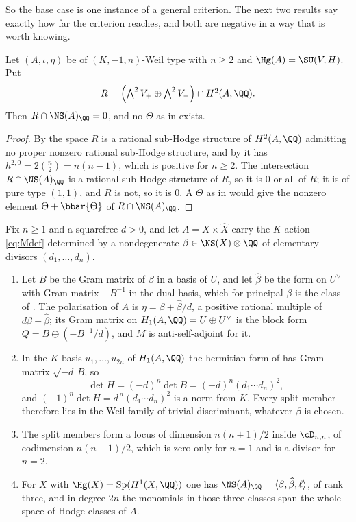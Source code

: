 So the base case is one instance of a general criterion. The next two results
say exactly how far the criterion reaches, and both are negative in a way that
is worth knowing.

\begin{proposition}\label{prop:divfails}
Let $(A,\iota,\eta)$ be of $(K,-1,n)$-Weil type with $n\ge2$ and
$\Hg(A)=\SU(V,H)$. Put
\[
  R=\Bigl(\textstyle\bigwedge^{2}V_{+}\oplus\bigwedge^{2}V_{-}\Bigr)
      \cap H^{2}(A,\QQ).
\]
Then $R\cap\NS(A)_{\QQ}=0$, and no $\Theta$ as in 
exists.
\end{proposition}

\begin{proof}
By  the space $R$ is a rational sub-Hodge structure of
$H^{2}(A,\QQ)$ admitting no proper nonzero rational sub-Hodge structure, and
by  it has $h^{2,0}=2\binom{n}{2}=n(n-1)$, which is
positive for $n\ge2$. The intersection
$R\cap\NS(A)_{\QQ}$ is a rational sub-Hodge structure of $R$, so it is $0$ or
all of $R$; it is of pure type $(1,1)$, and $R$ is not, so it is $0$. A
$\Theta$ as in  would give the nonzero element
$\Theta+\bbar{\Theta}$ of $R\cap\NS(A)_{\QQ}$.
\end{proof}

\begin{proposition}\label{prop:splitgeom}
Fix $n\ge1$ and a squarefree $d>0$, and let $A=X\times\widehat{X}$ carry the
$K$-action \eqref{eq:Mdef} determined by a nondegenerate
$\beta\in\NS(X)\otimes\QQ$ of elementary divisors $(d_{1},\dots,d_{n})$.
\begin{enumerate}[label=\textup{(\roman*)},nosep]
\item Let $B$ be the Gram matrix of $\beta$ in a basis of $U$, and let
  $\widehat\beta$ be the form on $U^{\vee}$ with Gram matrix $-B^{-1}$ in the
  dual basis, which for principal $\beta$ is the class of
  . The polarisation of $A$ is
  $\eta=\beta+\widehat{\beta}/d$, a positive rational multiple of
  $d\beta+\widehat\beta$; its Gram matrix on $H_{1}(A,\QQ)=U\oplus U^{\vee}$
  is the block form $Q=B\oplus(-B^{-1}/d)$, and $M$ is anti-self-adjoint for
  it.
\item In the $K$-basis $u_{1},\dots,u_{2n}$ of $H_{1}(A,\QQ)$ the hermitian
  form of  has Gram matrix $\sqrt{-d}\,B$, so
  \[
    \det H=(-d)^{n}\det B=(-d)^{n}(d_{1}\cdots d_{n})^{2},
  \]
  and $(-1)^{n}\det H=d^{\,n}(d_{1}\cdots d_{n})^{2}$ is a norm from $K$.
  Every split member therefore lies in the Weil family of trivial
  discriminant, whatever $\beta$ is chosen.
\item The split members form a locus of dimension $n(n+1)/2$ inside
  $\cD_{n,n}$, of codimension $n(n-1)/2$, which is zero only for $n=1$ and is
  a divisor for $n=2$.
\item For $X$ with $\Hg(X)=\mathrm{Sp}(H^{1}(X,\QQ))$ one has
  $\NS(A)_{\QQ}=\langle\beta,\widehat{\beta},\ell\rangle$, of rank three, and
  in degree $2n$ the monomials in those three classes span the whole space of
  Hodge classes of $A$.
\end{enumerate}
\end{proposition}

